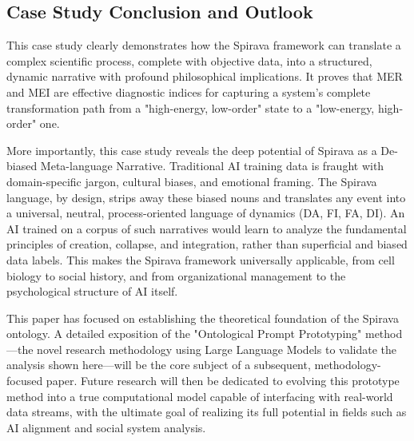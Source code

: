 \documentclass[11pt, a4paper]{article}
\begin{document}
\subsection{Case Study Conclusion and Outlook}
This case study clearly demonstrates how the Spirava framework can translate a complex scientific process, complete with objective data, into a structured, dynamic narrative with profound philosophical implications. It proves that MER and MEI are effective diagnostic indices for capturing a system's complete transformation path from a "high-energy, low-order" state to a "low-energy, high-order" one.

More importantly, this case study reveals the deep potential of Spirava as a De-biased Meta-language Narrative. Traditional AI training data is fraught with domain-specific jargon, cultural biases, and emotional framing. The Spirava language, by design, strips away these biased nouns and translates any event into a universal, neutral, process-oriented language of dynamics (DA, FI, FA, DI). An AI trained on a corpus of such narratives would learn to analyze the fundamental principles of creation, collapse, and integration, rather than superficial and biased data labels. This makes the Spirava framework universally applicable, from cell biology to social history, and from organizational management to the psychological structure of AI itself.

This paper has focused on establishing the theoretical foundation of the Spirava ontology. A detailed exposition of the "Ontological Prompt Prototyping" method—the novel research methodology using Large Language Models to validate the analysis shown here—will be the core subject of a subsequent, methodology-focused paper. Future research will then be dedicated to evolving this prototype method into a true computational model capable of interfacing with real-world data streams, with the ultimate goal of realizing its full potential in fields such as AI alignment and social system analysis.
\end{document}
